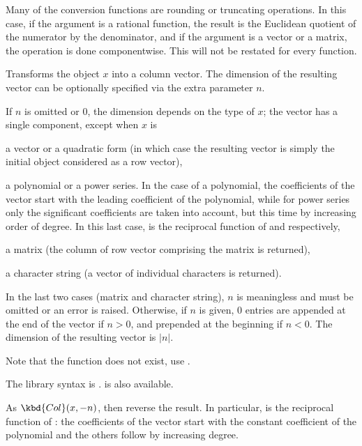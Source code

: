 \noindent
Many of the conversion functions are rounding or truncating operations. In
this case, if the argument is a rational function, the result is the
Euclidean quotient of the numerator by the denominator, and if the argument
is a vector or a matrix, the operation is done componentwise. This will not
be restated for every function.


\label{se:Col}
Transforms the object $x$ into a column vector. The dimension of the
resulting vector can be optionally specified via the extra parameter $n$.

If $n$ is omitted or $0$, the dimension depends on the type of $x$; the
vector has a single component, except when $x$ is

\item a vector or a quadratic form (in which case the resulting vector
is simply the initial object considered as a row vector),

\item a polynomial or a power series. In the case of a polynomial, the
coefficients of the vector start with the leading coefficient of the
polynomial, while for power series only the significant coefficients are
taken into account, but this time by increasing order of degree.
In this last case,  is the reciprocal function of  and
 respectively,

\item a matrix (the column of row vector comprising the matrix is returned),

\item a character string (a vector of individual characters is returned).

In the last two cases (matrix and character string), $n$ is meaningless and
must be omitted or an error is raised. Otherwise, if $n$ is given, $0$
entries are appended at the end of the vector if $n > 0$, and prepended at
the beginning if $n < 0$. The dimension of the resulting vector is $|n|$.

Note that the function  does not exist, use .

The library syntax is .
 is also available.

\label{se:Colrev}
As $\kbd{Col}(x, -n)$, then reverse the result. In particular,
 is the reciprocal function of : the
coefficients of the vector start with the constant coefficient of the
polynomial and the others follow by increasing degree.

